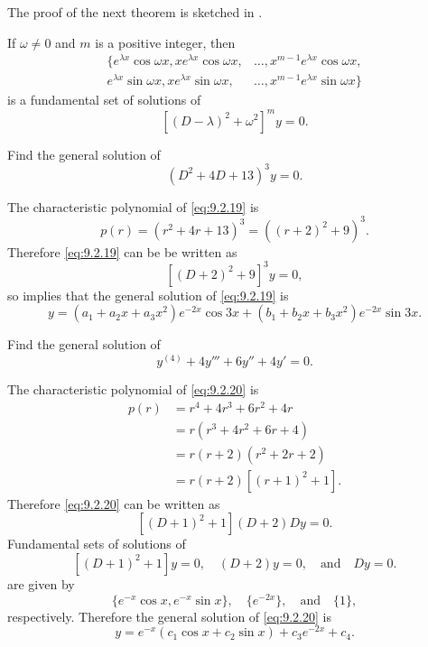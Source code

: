 The proof of the next theorem is sketched in
.

\begin{theorem}\label{thmtype:9.2.2}
If $\omega \ne0$ and $m$ is a positive integer, then
\begin{align*}
\{e^{\lambda x}\cos\omega x, xe^{\lambda x}\cos\omega x,
&\dots, x^{m-1}e^{\lambda x}\cos\omega x,\\
e^{\lambda x}\sin\omega x, xe^{\lambda x}\sin\omega x,&
\dots, x^{m-1}e^{\lambda x}\sin\omega x\}
\end{align*}
is a fundamental set of solutions of
\[
[(D-\lambda)^2+\omega^2]^my=0.
\]
\end{theorem}

\begin{example}\label{example:9.2.6}
Find the general solution of
\begin{equation} \label{eq:9.2.19}
(D^2+4D+13)^3y=0.
\end{equation}
\end{example}

\begin{solution}
The characteristic polynomial of \eqref{eq:9.2.19} is
\[
p(r)=(r^2+4r+13)^3=\left((r+2)^2+9\right)^3.
\]
Therefore \eqref{eq:9.2.19} can be be written as
\[
[(D+2)^2+9]^3y=0,
\]
so  implies that the general solution of
\eqref{eq:9.2.19} is
\[
y=(a_1+a_2x+a_3x^2)e^{-2x}\cos3x
+(b_1+b_2x+b_3x^2)e^{-2x}\sin3x.
\]
\end{solution}

\begin{example}\label{example:9.2.7}
Find the general solution of
\begin{equation} \label{eq:9.2.20}
y^{(4)}+4y'''+6y''+4y'=0.
\end{equation}
\end{example}

\begin{solution}
The characteristic polynomial of \eqref{eq:9.2.20} is
\begin{align*}
p(r)&=r^4+4r^3+6r^2+4r\\
&=r(r^3+4r^2+6r+4)\\
&=r(r+2)(r^2+2r+2)\\
&=r(r+2)[(r+1)^2+1].
\end{align*}
Therefore \eqref{eq:9.2.20} can be written as
\[
[(D+1)^2+1](D+2)Dy=0.
\]
Fundamental sets of solutions of
\[
\left[(D+1)^2+1\right] y=0,\quad (D+2) y=0,\quad\text{and}\quad  Dy=0.
\]
are given by
\[
\{e^{-x}\cos x,e^{-x}\sin x\},\quad \{e^{-2x}\},\quad\text{and}\quad  \{1\},
\]
respectively. Therefore the general solution of \eqref{eq:9.2.20} is
\[
y=e^{-x}(c_1\cos x+c_2\sin x)+c_3e^{-2x}+c_4.
\]
\end{solution}


